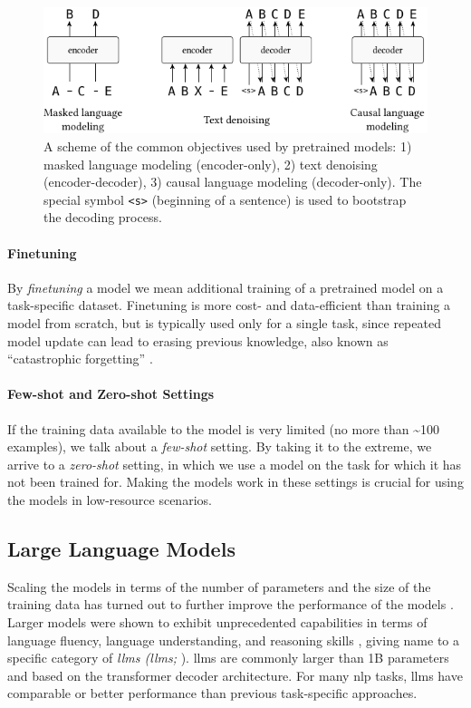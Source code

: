 \begin{figure}[t]
    \centering
    \includegraphics{img/objectives.pdf}

    \caption{A scheme of the common objectives used by pretrained models: 1) masked language modeling (encoder-only), 2) text denoising (encoder-decoder), 3)  causal language modeling (decoder-only). The special symbol \texttt{<s>} (beginning of a sentence) is used to bootstrap the decoding process.}\label{fig:objectives}

\end{figure}

\paragraph{Finetuning} By \emph{finetuning} a model we mean additional training of a pretrained model on a task-specific dataset. Finetuning is more cost- and data-efficient than training a model from scratch, but is typically used only for a single task, since repeated model update can lead to erasing previous knowledge, also known as ``catastrophic forgetting'' \cite{mccloskey1989catastrophic,kirkpatrick2017overcoming}.


\paragraph{Few-shot and Zero-shot Settings} If the training data available to the model is very limited (no more than \textasciitilde 100 examples), we talk about a \emph{few-shot} setting. By taking it to the extreme, we arrive to a \emph{zero-shot} setting, in which we use a model on the task for which it has not been trained for. Making the models work in these settings is crucial for using the models in low-resource scenarios.

\subsection{Large Language Models}
\label{sec:llms}
Scaling the models in terms of the number of parameters and the size of the training data has turned out to further improve the performance of the models \cite{kaplan2020scaling,hoffmann2022training}. Larger models were shown to exhibit unprecedented capabilities in terms of language fluency, language understanding, and reasoning skills \cite{wei2022emergent,bubeck2023sparks}, giving name to a specific category of \emph{\aclp{llm} (\acsp{llm};} \citealp{brown2020language,zhao2023survey}). \Acp{llm} are commonly larger than 1B parameters and based on the transformer decoder architecture. For many \ac{nlp} tasks, \acp{llm} have comparable or better performance than previous task-specific approaches.

